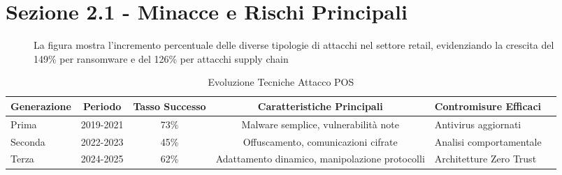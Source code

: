 \documentclass[12pt,a4paper]{article}
\begin{document}

\section*{Sezione 2.1 - Minacce e Rischi Principali}

\begin{figure}[htbp]
\centering
{}
\caption{La figura mostra l'incremento percentuale delle diverse tipologie di attacchi nel settore retail, evidenziando la crescita del 149\% per ransomware e del 126\% per attacchi supply chain}
\label{fig:threat_landscape_evolution}
\end{figure}

\begin{table}[htbp]
\centering
\caption{Evoluzione Tecniche Attacco POS}
\label{tab:pos_attack_evolution}
\begin{tabular}{@{}lcccp{4cm}c@{}}
\toprule
\textbf{Generazione} & \textbf{Periodo} & \textbf{Tasso Successo} & \textbf{Caratteristiche Principali} & \textbf{Contromisure Efficaci} \\
\midrule
Prima & 2019-2021 & 73\% & Malware semplice, vulnerabilità note & Antivirus aggiornati \\
\addlinespace
Seconda & 2022-2023 & 45\% & Offuscamento, comunicazioni cifrate & Analisi comportamentale \\
\addlinespace
Terza & 2024-2025 & 62\% & Adattamento dinamico, manipolazione protocolli & Architetture Zero Trust \\
\bottomrule
\end{tabular}
\end{table}
\end{document}
